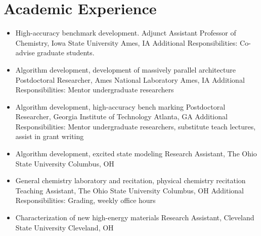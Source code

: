 \documentclass[11pt,a4paper,sans]{moderncv}
\begin{document}

\section{Academic Experience}
\vspace{5pt}
\begin{itemize}
	\item{
	      {High-accuracy benchmark development.}
	      {Adjunct Assistant Professor of Chemistry, Iowa State University}
	      {Ames, IA}
	      {}
	      {Additional Responsibilities: Co-advise graduate students.}}
	\item{
		  {Algorithm development, development of massively parallel
		  	 architecture}
		  {Postdoctoral Researcher, Ames National Laboratory}
		  {Ames, IA}
		  {}
		  {Additional Responsibilities: Mentor undergraduate researchers}}
	\item{
		  {Algorithm development, high-accuracy bench marking}
		  {Postdoctoral Researcher, Georgia Institute of Technology}
		  {Atlanta, GA}
		  {}
		  {Additional Responsibilities: Mentor undergraduate researchers,
		  	 substitute teach lectures, assist in grant writing}}
	\item{
		  {Algorithm development, excited state modeling}
		  {Research Assistant, The Ohio State University}
		  {Columbus, OH}
		  {}
		  {}}
	\item{
		  {General chemistry laboratory and recitation, physical chemistry
		   recitation}
		  {Teaching Assistant, The Ohio State University}
		  {Columbus, OH}
		  {}
		  {Additional Responsibilities: Grading, weekly office hours}}
	\item{
		{Characterization of new high-energy materials}
		{Research Assistant, Cleveland State University}
		{Cleveland, OH}
		{}
		{}}
\end{itemize}
\end{document}
